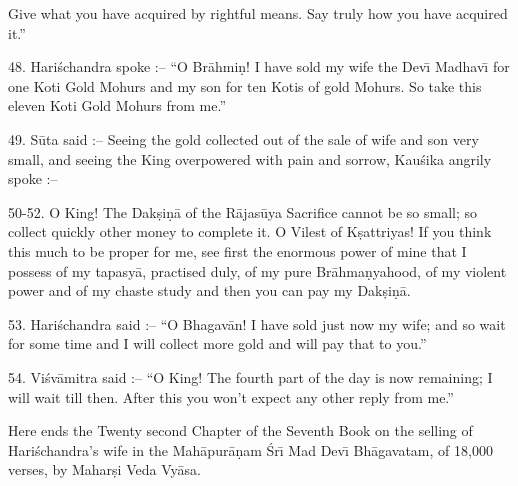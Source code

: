Give what you have acquired by rightful means. Say truly how you have acquired it.''

48. Hari\'schandra spoke :-- ``O Br\=ahmi\d{n}! I have sold my wife the Dev\={\i} Madhav\={\i} for one Koti Gold Mohurs and my son for ten Kotis of gold Mohurs. So take this eleven Koti Gold Mohurs from me.''

49. S\=uta said :-- Seeing the gold collected out of the sale of wife and son very small, and seeing the King overpowered with pain and sorrow, Kau\'sika angrily spoke :--

50-52. O King! The Dak\d{s}i\d{n}\=a of the R\=ajas\=uya Sacrifice cannot be so small; so collect quickly other money to complete it. O Vilest of K\d{s}attriyas! If you think this much to be proper for me, see first the enormous power of mine that I possess of my tapasy\=a, practised duly, of my pure Br\=ahma\d{n}yahood, of my violent power and of my chaste study and then you can pay my Dak\d{s}i\d{n}\=a.

53. Hari\'schandra said :-- ``O Bhagav\=an! I have sold just now my wife; and so wait for some time and I will collect more gold and will pay that to you.''

54. Vi\'sv\=amitra said :-- ``O King! The fourth part of the day is now remaining; I will wait till then. After this you won't expect any other reply from me.''

Here ends the Twenty second Chapter of the Seventh Book on the selling of Hari\'schandra's wife in the Mah\=apur\=a\d{n}am \'Sr\={\i} Mad Dev\={\i} Bh\=agavatam, of 18,000 verses, by Mahar\d{s}i Veda Vy\=asa.




